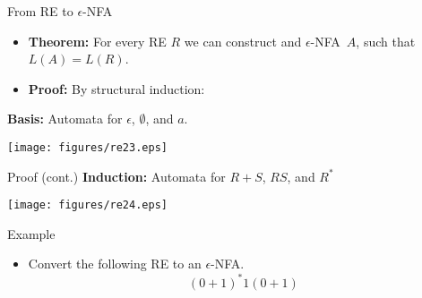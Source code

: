 \documentclass{prosper}%
\newcommand{\enfa}{{$\epsilon$-NFA}}
\newcommand{\e} {{\mbox{$\epsilon$}}}
\begin{document}
\begin{comment}
\begin{slide}{Example (cnt.)}
\begin{center}
\texttt{[image: figures/re20.eps]}
\end{center}
Then we have to branch, since there are two accepting states left and no non-accepting state other than the initial state.
\end{slide}

\begin{slide}{Example (cnt.)}
\begin{center}
\texttt{[image: figures/re21.eps]}
\end{center}
\end{slide}

\begin{slide}{Example (cnt.)}
And from the original FA
\begin{center}
\texttt{[image: figures/re22.eps]}
\end{center}
The Final RE is the union of the previous REs \[(0 + 1)^*1(0 + 1)(0 + 1) + (0 + 1)^*1(0 + 1)\]
\end{slide}
\end{comment}

\begin{slide}{From RE to \enfa}
\begin{itemize}
\item {\bf Theorem: } For every RE $R$ we can construct and \enfa\ $A$, such that $L(A) = L(R)$.
\item {\bf Proof:} By structural induction:
\end{itemize}
{\bf Basis: } Automata for \e, $\emptyset$, and $a$.
\begin{center}
\texttt{[image: figures/re23.eps]}
\end{center}
\end{slide}

\begin{slide}{Proof (cont.)}
{\bf Induction:} Automata for $R+S$, $RS$, and $R^*$
\begin{center}
\texttt{[image: figures/re24.eps]}
\end{center}
\end{slide}

\begin{slide}{Example}
\begin{itemize}
\item  Convert the following RE to an \enfa.
\[(0+1)^*1(0+1)\]
\end{itemize}
\end{slide}
\end{document}
